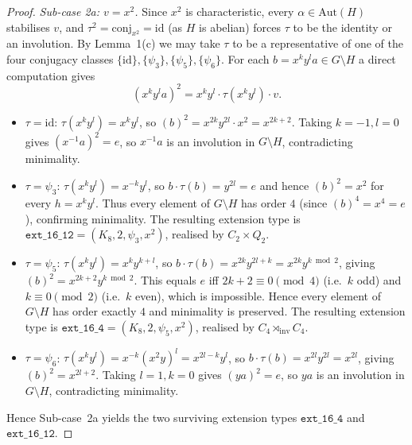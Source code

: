 \begin{proof}
  \smallskip
  \noindent
  \emph{Sub-case 2a: $v = x^2$.} Since $x^2$ is characteristic, every
  $\alpha \in \mathrm{Aut}(H)$ stabilises $v$, and $\tau^2 = \mathrm{conj}_{x^2}
  = \mathrm{id}$ (as $H$ is abelian) forces $\tau$ to be the identity or an
  involution. By Lemma~1(c) we may take $\tau$ to be a representative of one
  of the four conjugacy classes $\{\mathrm{id}\}, \{\psi_3\}, \{\psi_5\},
  \{\psi_6\}$. For each $b = x^k y^l a \in G \setminus H$ a direct computation
  gives
  \[
    (x^k y^l a)^2 = x^k y^l \cdot \tau(x^k y^l) \cdot v.
  \]
  \begin{itemize}
    \item $\tau = \mathrm{id}$: $\tau(x^k y^l) = x^k y^l$, so $(b)^2 = x^{2k}
    y^{2l} \cdot x^2 = x^{2k + 2}$. Taking $k = -1, l = 0$ gives $(x^{-1} a)^2
    = e$, so $x^{-1} a$ is an involution in $G \setminus H$, contradicting
    minimality.
    \item $\tau = \psi_3$: $\tau(x^k y^l) = x^{-k} y^l$, so $b \cdot \tau(b) =
    y^{2l} = e$ and hence $(b)^2 = x^2$ for every $h = x^k y^l$. Thus every
    element of $G \setminus H$ has order $4$ (since $(b)^4 = x^4 = e$),
    confirming minimality. The resulting extension type is
    $\mathtt{ext\_16\_12} = (K_8, 2, \psi_3, x^2)$, realised by
    $C_2 \times Q_2$.
    \item $\tau = \psi_5$: $\tau(x^k y^l) = x^k y^{k+l}$, so $b \cdot \tau(b)
    = x^{2k} y^{2l + k} = x^{2k} y^{k \bmod 2}$, giving
    $(b)^2 = x^{2k + 2} y^{k \bmod 2}$. This equals $e$ iff $2k + 2 \equiv 0
    \pmod 4$ (i.e.\ $k$ odd) and $k \equiv 0 \pmod 2$ (i.e.\ $k$ even),
    which is impossible. Hence every element of $G \setminus H$ has order
    exactly $4$ and minimality is preserved. The resulting extension type is
    $\mathtt{ext\_16\_4} = (K_8, 2, \psi_5, x^2)$, realised by $C_4 \rtimes
    _{\mathrm{inv}} C_4$.
    \item $\tau = \psi_6$: $\tau(x^k y^l) = x^{-k} (x^2 y)^l = x^{2l - k}
    y^l$, so $b \cdot \tau(b) = x^{2l} y^{2l} = x^{2l}$, giving $(b)^2 =
    x^{2l + 2}$. Taking $l = 1, k = 0$ gives $(y a)^2 = e$, so $y a$ is an
    involution in $G \setminus H$, contradicting minimality.
  \end{itemize}
  Hence Sub-case~2a yields the two surviving extension types
  $\mathtt{ext\_16\_4}$ and $\mathtt{ext\_16\_12}$.


\end{proof}
